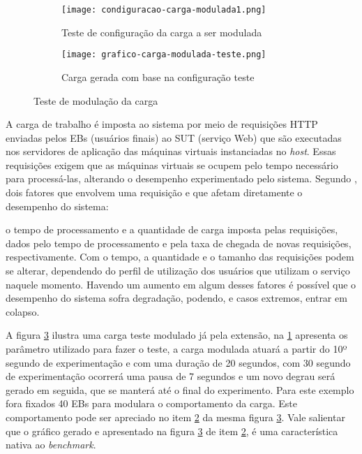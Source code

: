 \begin{figure}[!htb]
	\centering
	\begin{subfigure}{\linewidth}
		\centering
		\texttt{[image: condiguracao-carga-modulada1.png]}
		\caption{Teste de configuração da carga a ser modulada}
		\label{fig:configuracao-carga-modulada-teste}
	\end{subfigure}
	
	\begin{subfigure}{\linewidth}
		\centering
		\texttt{[image: grafico-carga-modulada-teste.png]}
		\caption{Carga gerada com base na configuração teste}
		\label{fig:grafico-carga-modulada-teste}
	\end{subfigure}  
	\caption{Teste de modulação da carga}  
	\label{fig:carga-modulada-teste}
	\fautor
\end{figure}  

A carga de trabalho é imposta ao sistema por meio de requisições HTTP enviadas pelos EBs (usuários finais) ao SUT (serviço Web) que são executadas nos servidores de aplicação das máquinas virtuais instanciadas no \textit{host}. Essas requisições exigem que as máquinas virtuais se ocupem pelo tempo necessário para processá-las, alterando o desempenho experimentado pelo sistema.
Segundo \cite{Nobile2013}, dois fatores que envolvem uma requisição e que afetam diretamente o desempenho do sistema:
\begin{citacao}
	o tempo de processamento e a quantidade de carga imposta pelas requisições, dados pelo tempo de processamento e pela taxa de chegada de novas requisições, respectivamente. Com o tempo, a quantidade e o tamanho das requisições podem se alterar, dependendo do perfil de utilização dos usuários que utilizam o serviço naquele momento. Havendo um aumento em algum desses fatores é possível que o desempenho do sistema sofra degradação, podendo, e casos extremos, entrar em colapso.
\end{citacao}

A figura \ref{fig:carga-modulada-teste} ilustra uma carga teste modulado já pela extensão, na \ref{fig:configuracao-carga-modulada-teste} apresenta os parâmetro utilizado para fazer o teste, a carga modulada atuará a partir do 10º segundo de experimentação e com uma duração de 20 segundos, com 30 segundo de experimentação ocorrerá uma pausa de 7 segundos e um novo degrau será gerado em seguida, que se manterá até o final do experimento. Para este exemplo fora fixados 40 EBs para modulara o comportamento da carga. Este comportamento pode ser apreciado no item \ref{fig:grafico-carga-modulada-teste} da mesma figura \ref{fig:carga-modulada-teste}. Vale salientar que o gráfico gerado e apresentado na figura \ref{fig:carga-modulada-teste} de item \ref{fig:grafico-carga-modulada-teste}, é uma característica nativa ao \textit{benchmark}.